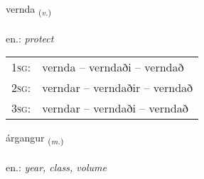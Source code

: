 \documentclass[frontgrid, backgrid]{flacards}\usepackage[]{graphicx}\usepackage[]{xcolor}
\begin{document}
\renewcommand{\flhead}{\vskip5pt \fboxsep=0pt {\small\bfseries\footnotesize Sagnorð | Verb}}
\renewcommand{\fcfoot}{\vskip5pt \fboxsep=0pt \hspace{2pt}{\small\bfseries\footnotesize 2K}}

\renewcommand{\blhead}{\vskip5pt {\small\bfseries\footnotesize Sagnorð | Verb }}
\renewcommand{\bcfoot}{\vskip5pt \hspace{2pt}{\small\bfseries\footnotesize 2K}}


{vernda \small{\textsubscript{(\textit{v.})}} \\[1ex] %
\textphonetic{[vɛrnta]} \\
en.: \emph{protect} \\  [2ex]
\renewcommand*{\arraystretch}{0.8}
\begin{tabular}{p{1cm}l}
\textsc{1sg}: & vernda -- verndaði -- verndað \\ 
\textsc{2sg}: & verndar -- verndaðir -- verndað \\ 
\textsc{3sg}: & verndar -- verndaði -- verndað \\ 
\end{tabular}
}

\renewcommand{\flhead}{\vskip5pt \fboxsep=0pt {\small\bfseries\footnotesize Nafnorð | Noun}}
\renewcommand{\fcfoot}{\vskip5pt \fboxsep=0pt \hspace{2pt}{\small\bfseries\footnotesize 2K}}

\renewcommand{\blhead}{\vskip5pt {\small\bfseries\footnotesize Nafnorð | Noun }}
\renewcommand{\bcfoot}{\vskip5pt \hspace{2pt}{\small\bfseries\footnotesize 2K}}


{árgangur \small{\textsubscript{(\textit{m.})}} \\[1ex] %
\textphonetic{[aurkauŋkʏr]} \\
en.: \emph{year, class, volume} \\  [2ex]
\renewcommand*{\arraystretch}{0.8}
}
\end{document}
